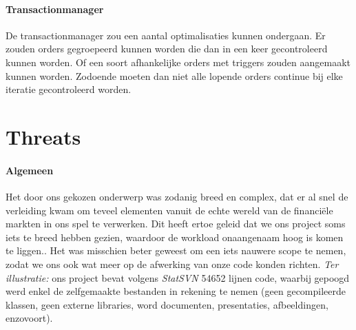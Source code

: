 \paragraph{Transactionmanager} De transactionmanager zou een aantal optimalisaties kunnen ondergaan. Er zouden orders gegroepeerd kunnen worden die dan in een keer gecontroleerd kunnen worden. Of een soort afhankelijke orders met triggers zouden aangemaakt kunnen worden. Zodoende moeten dan niet alle lopende orders continue bij elke iteratie gecontroleerd worden.


\section{Threats}


\paragraph{Algemeen} Het door ons gekozen onderwerp was zodanig breed en complex, dat er al snel de verleiding kwam om teveel elementen vanuit de echte wereld van de financi\"ele markten in ons spel te verwerken. Dit heeft ertoe geleid dat we ons project soms iets te breed hebben gezien, waardoor de workload onaangenaam hoog is komen te liggen.. Het was misschien beter geweest om een iets nauwere scope te nemen, zodat we ons ook wat meer op de afwerking van onze code konden richten.
\emph{Ter illustratie: }ons project bevat volgens \emph{StatSVN} 54652 lijnen code, waarbij gepoogd werd enkel de zelfgemaakte bestanden in rekening te nemen (geen gecompileerde klassen, geen externe libraries, word documenten, presentaties, afbeeldingen, enzovoort). 


